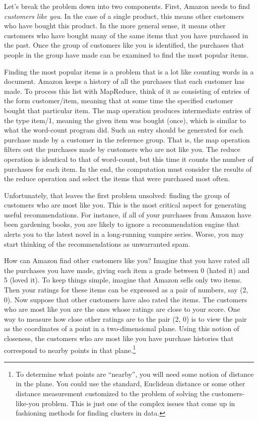 Let's break the problem down into
two components.  First, Amazon 
needs to find \emph{customers like you}.  
In the case of a single product, this means other customers who
have bought this product.  In the more general sense, 
it means other customers who have bought many
of the same items that you have purchased in the past. 
Once the group of
customers like you is identified, the purchases
that people in the group have made can be examined
to find the most popular items.

Finding the most popular items is a problem that is a lot like
counting words in a document.
Amazon keeps a history of all the purchases that each
customer has made.  To process this list with MapReduce, think of it as
consisting of entries of the form customer/item, meaning that at some time the specified
customer bought that particular item.  
The map operation produces intermediate entries of the type item/1, meaning
the given item was bought (once), 
which is similar to what the word-count program did.
Such an entry should be generated for
each purchase made by a customer in the reference group.  That is,
the map operation filters out the purchases made by customers who are
not like you. The reduce operation is identical to that of word-count,
but this time it counts the number of purchases for each item.
In the end, the computation must consider the results of the reduce operation
and select the items that were purchased most often.

Unfortunately, that leaves the first problem unsolved: finding the group of
customers who are most like you.  This is the most critical aspect for
generating useful recommendations.  For instance, if all of your purchases
from Amazon have been gardening books, you are likely to ignore a
recommendation engine that alerts you to the latest novel in a long-running
vampire series.  Worse, you may start thinking of the recommendations
as unwarranted spam.

How can Amazon find other customers like you?  Imagine that
you have rated all the purchases you have made, giving each item a grade between
0 (hated it) and 5 (loved it).  To keep things simple, imagine that Amazon
sells only two items.  Then your ratings for these items can be expressed as
a pair of numbers, say (2, 0).  Now suppose that other customers have also
rated the items.  The customers who are most like you are the ones
whose ratings are close to your score.  
One way to measure how close other ratings are to the pair (2, 0) 
is to view the pair
as the coordinates of a point in a two-dimensional plane.
Using this notion of closeness, the customers who
are most like you have purchase histories that correspond to nearby
points in that plane.\footnote{To
determine what points are ``nearby'', you will need
some notion of distance in the plane. You could use the standard,
Euclidean distance or some other distance measurement customized
to the problem of solving the customers-like-you problem.
This is just one of the complex issues that come up
in fashioning methods for finding clusters in data.}


